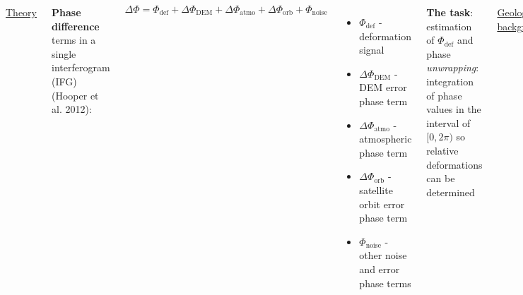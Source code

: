 \documentclass[18pt, a0paper, landscape]{tikzposter}
\begin{document}
\begin{columns}

    {
        \begin{center}
            {\Large \color{blue} \underline{Theory}}
        \end{center}

        \vspace{12pt}

        \textbf{Phase difference} terms in a single interferogram (IFG)
        (Hooper et al. 2012):

        \[
            \Delta\Phi = \Phi_{\text{def}} + \Delta\Phi_{\text{DEM}} +
            \Delta\Phi_{\text{atmo}} + \Delta\Phi_{\text{orb}} +
            \Phi_{\text{noise}}
        \]

        \begin{itemize}
            \item $\Phi_{\text{def}}$ - deformation signal
            \item $\Delta\Phi_{\text{DEM}}$ - DEM error phase term
            \item $\Delta\Phi_{\text{atmo}}$ - atmospheric phase term
            \item $\Delta\Phi_{\text{orb}}$ - satellite orbit error phase
            term
            \item $\Phi_{\text{noise}}$ - other noise and error phase
            terms
        \end{itemize}

        \textbf{The task}: estimation of $\Phi_{\text{def}}$ and phase
        \textit{unwrapping}: integration of phase values in the interval
        of $[0, 2\pi)$ so relative deformations can be determined

        \vspace{15pt}

        \begin{center}
            {\Large \color{blue} \underline{Geological background}}
        \end{center}

        \begin{itemize}
            \item \textbf{Ciomadul volcano} - western side of Carpathians-bend
            area
            \item low-resistivity, low-velocity anomaly under Ciomadul
            $\rightarrow$ PAMS volcano: ``volcano with potentially active
            magma storage'' (Harangi et al. 2014)
            \item near the \textbf{Vrancea zone:} subduction zone accompanied by
            intraplate, sub-crustal earthquakes
        \end{itemize}

}
\end{columns}
\end{document}
